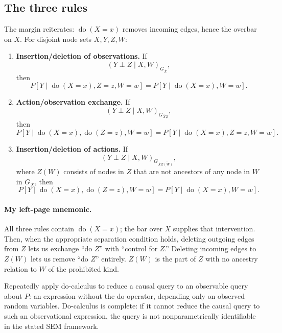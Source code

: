 \subsection{The three rules}
The margin reiterates: $\operatorname{do}(X=x)$ removes incoming edges, hence the overbar on $X$. For disjoint node sets $X,Y,Z,W$:
\begin{enumerate}
 \item \textbf{Insertion/deletion of observations.} If
 \[(Y\perp Z\mid X,W)_{G_{\overline X}},\]
 then
 \[
 P[Y\mid\operatorname{do}(X=x),Z=z,W=w]
 =P[Y\mid\operatorname{do}(X=x),W=w].
 \]
 \item \textbf{Action/observation exchange.} If
 \[(Y\perp Z\mid X,W)_{G_{\overline X\underline Z}},\]
 then
 \[
 P[Y\mid\operatorname{do}(X=x),\operatorname{do}(Z=z),W=w]
 =P[Y\mid\operatorname{do}(X=x),Z=z,W=w].
 \]
 \item \textbf{Insertion/deletion of actions.} If
 \[(Y\perp Z\mid X,W)_{G_{\overline X\overline{Z(W)}}},\]
 where $Z(W)$ consists of nodes in $Z$ that are not ancestors of any node in $W$ in $G_{\overline X}$, then
 \[
 P[Y\mid\operatorname{do}(X=x),\operatorname{do}(Z=z),W=w]
 =P[Y\mid\operatorname{do}(X=x),W=w].
 \]
\end{enumerate}
\paragraph{My left-page mnemonic.}
All three rules contain $\operatorname{do}(X=x)$; the bar over $X$ supplies that intervention. Then, when the appropriate separation condition holds, deleting outgoing edges from $Z$ lets us exchange ``do $Z$'' with ``control for $Z$.'' Deleting incoming edges to $Z(W)$ lets us remove ``do $Z$'' entirely. $Z(W)$ is the part of $Z$ with no ancestry relation to $W$ of the prohibited kind.

Repeatedly apply do-calculus to reduce a causal query to an observable query about $P$: an expression without the do-operator, depending only on observed random variables. Do-calculus is complete: if it cannot reduce the causal query to such an observational expression, the query is not nonparametrically identifiable in the stated SEM framework.

